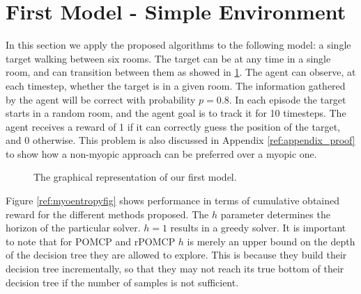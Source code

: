 \section{First Model - Simple Environment}

In this section we apply the proposed algorithms to the following model: a single target walking
between six rooms. The target can be at any time in a single room, and can transition between them
as showed in \ref{ref:nonmyo1}. The agent can observe, at each timestep, whether the target is in a
given room. The information gathered by the agent will be correct with probability $p=0.8$. In each
episode the target starts in a random room, and the agent goal is to track it for 10 timesteps. The
agent receives a reward of 1 if it can correctly guess the position of the target, and 0 otherwise.
This problem is also discussed in Appendix \ref{ref:appendix_proof} to show how a non-myopic
approach can be preferred over a myopic one.

\begin{figure}[ht]
\centering
{}
\caption{The graphical representation of our first model.}
\label{ref:nonmyo1}
\end{figure}

Figure \ref{ref:myoentropyfig} shows performance in terms of cumulative obtained reward for the
different methods proposed. The $h$ parameter determines the horizon of the particular solver. $h =
1$ results in a greedy solver. It is important to note that for POMCP and rPOMCP $h$ is merely an
upper bound on the depth of the decision tree they are allowed to explore. This is because they
build their decision tree incrementally, so that they may not reach its true bottom of their
decision tree if the number of samples is not sufficient.

